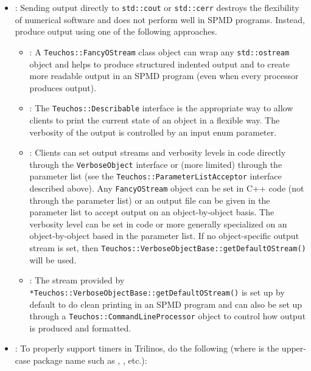 \begin{itemize}
\item\GCGStdStream: Sending output directly to \texttt{std\-::cout} or
  \texttt{std\-::cerr} destroys the flexibility of numerical software
  and does not perform well in SPMD programs.  Instead, produce output
  using one of the following approaches.

  \begin{itemize}
  \item\GCGTeuchosFancyOStream: A \texttt{Teuchos\-::Fancy\-OStream}
    class object can wrap any \texttt{std\-::ostream} object and helps
    to produce structured indented output and to create more readable
    output in an SPMD program (even when every processor produces
    output).
  
  \item\GCGTeuchosDescribable: The \texttt{Teuchos\-::Describable}
    interface is the appropriate way to allow clients to print the
    current state of an object in a flexible way.  The verbosity of
    the output is controlled by an input enum parameter.
  
  \item\GCGTeuchosVerboseObject: Clients can set output streams and
    verbosity levels in code directly through the
    {}\texttt{VerboseObject} interface or (more limited) through the
    parameter list (see the
    {}\texttt{Teuchos\-::ParameterListAcceptor} interface described
    above).  Any {}\texttt{FancyOStream} object can be set in C++ code
    (not through the parameter list) or an output file can be given in
    the parameter list to accept output on an object-by-object basis.
    The verbosity level can be set in code or more generally
    specialized on an object-by-object based in the parameter list.
    If no object-specific output stream is set, then
    {}\texttt{Teuchos\-::Verbose\-Object\-Base\-::get\-Default\-OStream()}
    will be used.
  
  \item\GCGTeuchosVerboseObjectBaseDefaultOStream: The stream provided
    by
    \texttt{*Teuchos\-::Verbose\-Object\-Base\-::get\-Default\-OStream()}
    is set up by default to do clean printing in an SPMD program and
    can also be set up through a
    \texttt{Teuchos\-::Command\-Line\-Processor} object to control how
    output is produced and formatted.

  \end{itemize}

{}\item\GCGTeuchosTimers: To properly support timers in Trilinos, do
the following (where {} is the upper-case package
name such as {}, {}, etc.):


\end{itemize}
